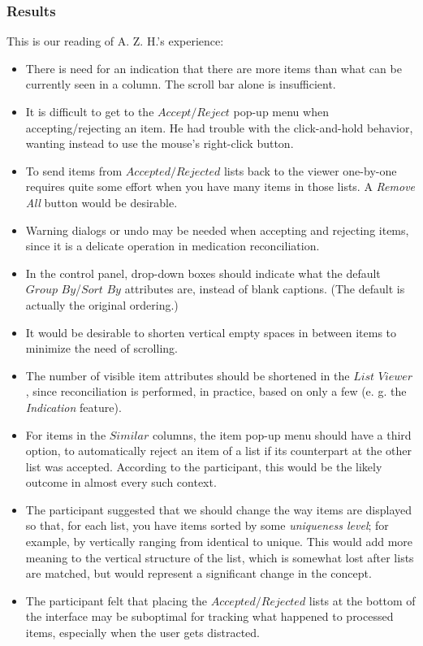\documentclass{chi2009}
\newcommand{\ListViewer}{\textit{List Viewer}}
\newcommand{\AcceptReject}{\textit{Accept/Reject}}
\newcommand{\AcceptedRejected}{\textit{Accepted/Rejected}}
\newcommand{\GroupBy}{\textit{Group By}}
\newcommand{\SortBy}{\textit{Sort By}}
\newcommand{\Similar}{\textit{Similar}}
\begin{document}
\subsubsection{Results}
This is our reading of A. Z. H.'s experience:
\begin{itemize}
\item There is need for an indication that there are more items than what can be currently seen in a column. The scroll bar alone is insufficient.
\item It is difficult to get to the $\AcceptReject$ pop-up menu when accepting/rejecting an item. He had trouble with the click-and-hold behavior, wanting instead to use the mouse's right-click button.
\item To send items from $\AcceptedRejected$ lists back to the viewer one-by-one requires quite some effort when you have many items in those lists. A \textit{Remove All} button would be desirable.
\item Warning dialogs or undo may be needed when accepting and rejecting items, since it is a delicate operation in medication reconciliation.
\item In the control panel, drop-down boxes should indicate what the default $\GroupBy$/$\SortBy$ attributes are, instead of blank captions. (The default is actually the original ordering.)
\item It would be desirable to shorten vertical empty spaces in between items to minimize the need of scrolling.
\item The number of visible item attributes should be shortened in the $\ListViewer$, since reconciliation is performed, in practice, based on only a few (e. g. the \textit{Indication} feature).
\item For items in the $\Similar$ columns, the item pop-up menu should have a third option, to automatically reject an item of a list if its counterpart at the other list was accepted. According to the participant, this would be the likely outcome in almost every such context.
\item The participant suggested that we should change the way items are displayed so that, for each list, you have items sorted by some \textit{uniqueness level}; for example, by vertically ranging from identical to unique. This would add more meaning to the vertical structure of the list, which is somewhat lost after lists are matched, but would represent a significant change in the concept.
\item The participant felt that placing the $\AcceptedRejected$ lists at the bottom of the interface may be suboptimal for tracking what happened to processed items, especially when the user gets distracted.

\end{itemize}
\end{document}
